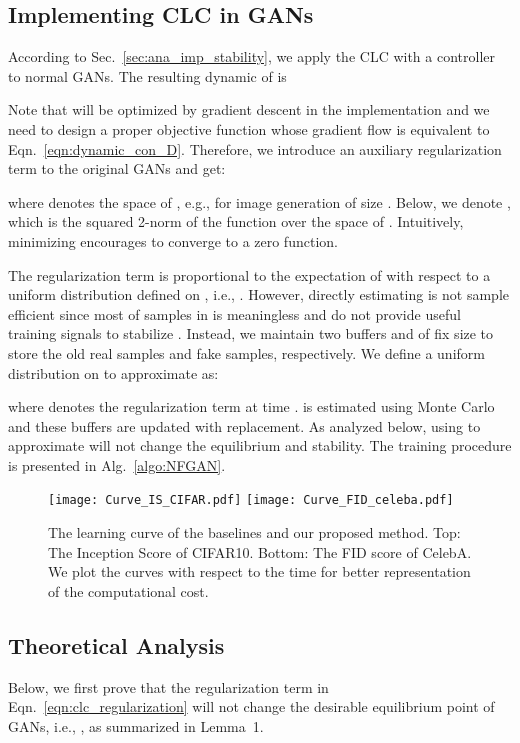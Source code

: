 \documentclass{article}
\newcommand{\eqn}[1]{Eqn.~\eqref{eqn:#1}}
\newcommand{\secref}[1]{Sec.~\ref{sec:#1}} \usepackage{wrapfig}
\theoremstyle{definition}
\begin{document}
\subsection{Implementing CLC in GANs}
\label{sec:implementation}



According to \secref{ana_imp_stability}, we apply the CLC with a controller  to normal GANs. 
The resulting dynamic of  is

Note that  will be optimized by gradient descent in the implementation and we need to design a proper objective function whose gradient flow is equivalent to \eqn{dynamic_con_D}.
Therefore, we introduce an auxiliary regularization term to the original GANs and get:

where  denotes the space of , e.g.,  for image generation of size .
Below, we denote , which is the squared 2-norm of the function  over the space of . Intuitively, minimizing  encourages  to converge to a zero function.


The regularization term  is proportional to the expectation of  with respect to a uniform distribution  defined on , i.e., .
However, directly estimating  is not sample efficient since most of samples in  is meaningless and do not provide useful training signals to stabilize .
Instead, we maintain two buffers  and  of fix size  to store the old real samples and fake samples, respectively. We define a uniform distribution  on  to approximate  as:

where  denotes the regularization term at time .
 is estimated using Monte Carlo and these buffers are updated with replacement. As analyzed below, using  to approximate  will not change the equilibrium and stability.
The training procedure is presented in Alg.~\ref{algo:NFGAN}.



\begin{figure}[t]
\centering
	\texttt{[image: Curve\_IS\_CIFAR.pdf]}
\texttt{[image: Curve\_FID\_celeba.pdf]}
\caption{The learning curve of the baselines and our proposed method. Top: The Inception Score of CIFAR10. Bottom: The FID score of CelebA. We plot the curves with respect to the time for better representation of the computational cost.}
	\label{fig:learning_curve}
\end{figure}

\subsection{Theoretical Analysis}
Below, we first prove that the regularization term in \eqn{clc_regularization} will not change the desirable equilibrium point of GANs, i.e., , as summarized in Lemma~1.
\end{document}
